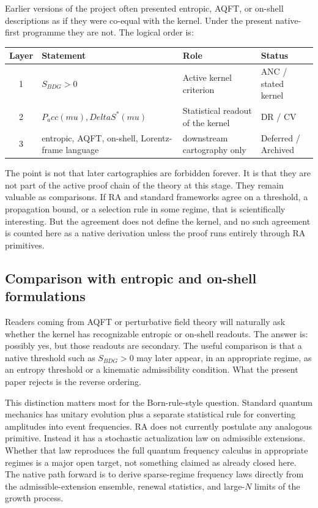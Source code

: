 \documentclass[11pt]{article}
\def\Delta{Delta}%
\def\mu{mu}%
\def\mathrm#1{#1}%
\def\Pacc{P_acc}%
\newcommand{\Pacc}{\ensuremath{P_{\mathrm{acc}}}}
\begin{document}
Earlier versions of the project often presented entropic, AQFT, or on-shell descriptions as if they were co-equal with the kernel. Under the present native-first programme they are not. The logical order is:
\begin{center}
\begin{tabular}{clll}
\toprule
Layer & Statement & Role & Status \\
\midrule
1 & $S_{\mathrm{BDG}} > 0$ & Active kernel criterion & ANC / stated kernel \\
2 & $\Pacc(\mu), \Delta S^*(\mu)$ & Statistical readout of the kernel & DR / CV \\
3 & entropic, AQFT, on-shell, Lorentz-frame language & downstream cartography only & Deferred / Archived \\
\bottomrule
\end{tabular}
\end{center}

The point is not that later cartographies are forbidden forever. It is that they are not part of the active proof chain of the theory at this stage. They remain valuable as comparisons. If RA and standard frameworks agree on a threshold, a propagation bound, or a selection rule in some regime, that is scientifically interesting. But the agreement does not define the kernel, and no such agreement is counted here as a native derivation unless the proof runs entirely through RA primitives.

\subsection{Comparison with entropic and on-shell formulations}

Readers coming from AQFT or perturbative field theory will naturally ask whether the kernel has recognizable entropic or on-shell readouts. The answer is: possibly yes, but those readouts are secondary. The useful comparison is that a native threshold such as $S_{\mathrm{BDG}}>0$ may later appear, in an appropriate regime, as an entropy threshold or a kinematic admissibility condition. What the present paper rejects is the reverse ordering.

This distinction matters most for the Born-rule-style question. Standard quantum mechanics has unitary evolution plus a separate statistical rule for converting amplitudes into event frequencies. RA does not currently postulate any analogous primitive. Instead it has a stochastic actualization law on admissible extensions. Whether that law reproduces the full quantum frequency calculus in appropriate regimes is a major open target, not something claimed as already closed here. The native path forward is to derive sparse-regime frequency laws directly from the admissible-extension ensemble, renewal statistics, and large-$N$ limits of the growth process.
\end{document}
